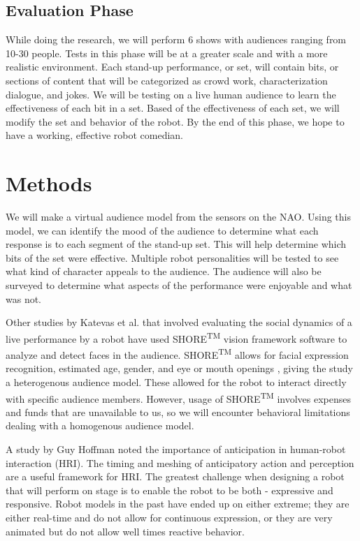 \documentclass[onecolumn, draftclsnofoot,10pt, compsoc]{IEEEtran}
\begin{document}
\subsection{Evaluation Phase}
While doing the research, we will perform 6 shows with audiences ranging from 10-30 people. Tests in this phase will be at a greater scale and with a more realistic environment. Each stand-up performance, or set, will contain bits, or sections of content that will be categorized as crowd work, characterization dialogue, and jokes. We will be testing on a live human audience to learn the effectiveness of each bit in a set. Based of the effectiveness of each set, we will modify the set and behavior of the robot. By the end of this phase, we hope to have a working, effective robot comedian.

\section{Methods}
We will make a virtual audience model from the sensors on the NAO. Using this model, we can identify the mood of the audience to determine what each response is to each segment of the stand-up set. This will help determine which bits of the set were effective. Multiple robot personalities will be tested to see what kind of character appeals to the audience. The audience will also be surveyed to determine what aspects of the performance were enjoyable and what was not.


Other studies by Katevas et al. \cite{KatevasRobot:2014} that involved evaluating the social dynamics of a live performance by a robot have used SHORE\textsuperscript{TM} vision framework software to analyze and detect faces in the audience. SHORE\textsuperscript{TM} allows for facial expression recognition, estimated age, gender, and eye or mouth openings \cite{SHORE}, giving the study a heterogenous audience model. These allowed for the robot to interact directly with specific audience members. However, usage of SHORE\textsuperscript{TM} involves expenses and funds that are unavailable to us, so we will encounter behavioral limitations dealing with a homogenous audience model.

A study by Guy Hoffman {\cite{hoffman2010anticipation}} noted the importance of anticipation in human-robot interaction (HRI). The timing and meshing of anticipatory action and perception are a useful framework for HRI. The greatest challenge when designing a robot that will perform on stage is to enable the robot to be both - expressive and responsive. Robot models in the past have ended up on either extreme; they are either real-time and do not allow for continuous expression, or they are very animated but do not allow well times reactive behavior.
\end{document}
